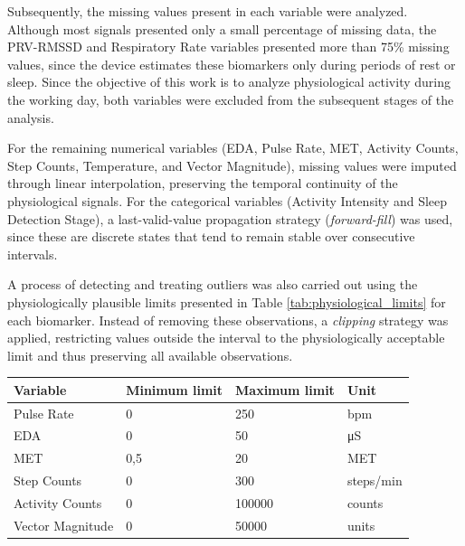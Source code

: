 \documentclass[a4paper,fleqn]{cas-sc}
\begin{document}
Subsequently, the missing values present in each variable were analyzed. Although most signals presented only a small percentage of missing data, the PRV-RMSSD and Respiratory Rate variables presented more than 75\% missing values, since the device estimates these biomarkers only during periods of rest or sleep. Since the objective of this work is to analyze physiological activity during the working day, both variables were excluded from the subsequent stages of the analysis.

For the remaining numerical variables (EDA, Pulse Rate, MET, Activity Counts, Step Counts, Temperature, and Vector Magnitude), missing values were imputed through linear interpolation, preserving the temporal continuity of the physiological signals. For the categorical variables (Activity Intensity and Sleep Detection Stage), a last-valid-value propagation strategy (\textit{forward-fill}) was used, since these are discrete states that tend to remain stable over consecutive intervals.

A process of detecting and treating outliers was also carried out using the physiologically plausible limits presented in Table \ref{tab:physiological_limits} for each biomarker. Instead of removing these observations, a \textit{clipping} strategy was applied, restricting values outside the interval to the physiologically acceptable limit and thus preserving all available observations.

\begin{center}
\label{tab:physiological_limits}
\small
\begin{tabular*}{.95\textwidth}{@{} p{.32\linewidth} p{.20\linewidth} p{.20\linewidth} p{.18\linewidth} @{} }
\toprule
\textbf{Variable} & \textbf{Minimum limit} & \textbf{Maximum limit} & \textbf{Unit} \\
\midrule
Pulse Rate & 0 & 250 & bpm \\
EDA & 0 & 50 & \si{\micro\siemens} \\
MET & 0,5 & 20 & MET \\
Step Counts & 0 & 300 & steps/min \\
Activity Counts & 0 & 100000 & counts \\
Vector Magnitude & 0 & 50000 & units \\
\bottomrule
\end{tabular*}
\end{center}
\end{document}
